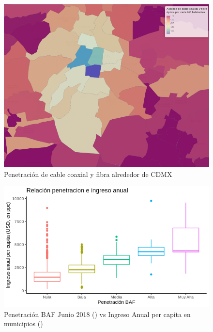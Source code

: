 \documentclass[9pt,twocolumn,twoside]{ilcss}
\begin{document}
\begin{Apendices}
\begin{figure}[tbhp]
	\centering
	\includegraphics[width=0.9\linewidth]{images/pen_habs_cdmx.png}
	\caption{Penetración de cable coaxial y fibra alrededor de CDMX}
	\label{fig:pen_habs_cdmx}
\end{figure}

\begin{figure}[tbhp]
	\centering
	\includegraphics[width=1.0\linewidth]{images/pen_income.png}
	\caption{Penetración BAF Junio 2018 (\cite{IFT2019BIT}) vs Ingreso Anual per capita en municipios (\cite{ONU2015}) }
	\label{fig:pen_income}
\end{figure}


\end{Apendices}
\end{document}
